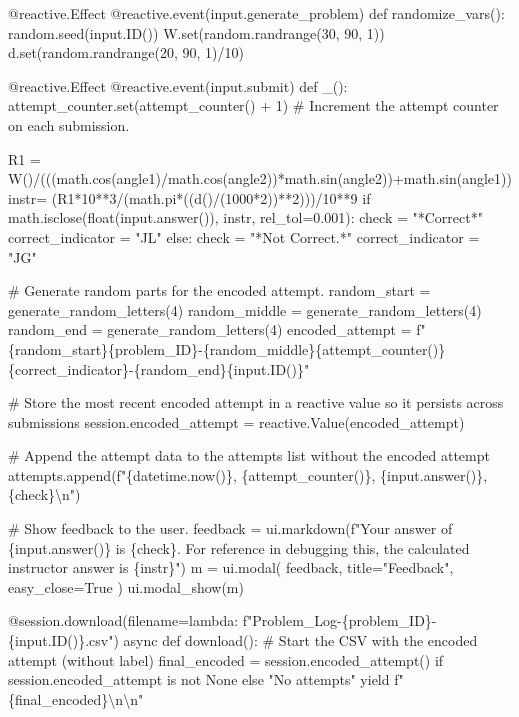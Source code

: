 \documentclass[
  letterpaper,
  DIV=11,
  numbers=noendperiod]{scrreprt}
\newenvironment{Shaded}{\begin{snugshade}}{\end{snugshade}}
\newcommand{\NormalTok}[1]{\textcolor[rgb]{0.00,0.23,0.31}{#1}}
\begin{document}
\begin{Shaded}
\begin{Highlighting}[]
\NormalTok{    @reactive.Effect}
\NormalTok{    @reactive.event(input.generate\_problem)}
\NormalTok{    def randomize\_vars():}
\NormalTok{        random.seed(input.ID())}
\NormalTok{        W.set(random.randrange(30, 90, 1))}
\NormalTok{        d.set(random.randrange(20, 90, 1)/10)}
        

\NormalTok{    @reactive.Effect}
\NormalTok{    @reactive.event(input.submit)}
\NormalTok{    def \_():}
\NormalTok{        attempt\_counter.set(attempt\_counter() + 1)  \# Increment the attempt counter on each submission.}
    
\NormalTok{        R1 = W()/(((math.cos(angle1)/math.cos(angle2))*math.sin(angle2))+math.sin(angle1))}
\NormalTok{        instr= (R1*10**3/(math.pi*((d()/(1000*2))**2)))/10**9}
\NormalTok{        if math.isclose(float(input.answer()), instr, rel\_tol=0.001):}
\NormalTok{            check = "*Correct*"}
\NormalTok{            correct\_indicator = "JL"}
\NormalTok{        else:}
\NormalTok{            check = "*Not Correct.*"}
\NormalTok{            correct\_indicator = "JG"}

\NormalTok{        \# Generate random parts for the encoded attempt.}
\NormalTok{        random\_start = generate\_random\_letters(4)}
\NormalTok{        random\_middle = generate\_random\_letters(4)}
\NormalTok{        random\_end = generate\_random\_letters(4)}
\NormalTok{        encoded\_attempt = f"\{random\_start\}\{problem\_ID\}{-}\{random\_middle\}\{attempt\_counter()\}\{correct\_indicator\}{-}\{random\_end\}\{input.ID()\}"}

\NormalTok{        \# Store the most recent encoded attempt in a reactive value so it persists across submissions}
\NormalTok{        session.encoded\_attempt = reactive.Value(encoded\_attempt)}

\NormalTok{        \# Append the attempt data to the attempts list without the encoded attempt}
\NormalTok{        attempts.append(f"\{datetime.now()\}, \{attempt\_counter()\}, \{input.answer()\}, \{check\}\textbackslash{}n")}

\NormalTok{        \# Show feedback to the user.}
\NormalTok{        feedback = ui.markdown(f"Your answer of \{input.answer()\} is \{check\}. For reference in debugging this, the calculated instructor answer is \{instr\}")}
\NormalTok{        m = ui.modal(}
\NormalTok{            feedback,}
\NormalTok{            title="Feedback",}
\NormalTok{            easy\_close=True}
\NormalTok{        )}
\NormalTok{        ui.modal\_show(m)}

\NormalTok{    @session.download(filename=lambda: f"Problem\_Log{-}\{problem\_ID\}{-}\{input.ID()\}.csv")}
\NormalTok{    async def download():}
\NormalTok{        \# Start the CSV with the encoded attempt (without label)}
\NormalTok{        final\_encoded = session.encoded\_attempt() if session.encoded\_attempt is not None else "No attempts"}
\NormalTok{        yield f"\{final\_encoded\}\textbackslash{}n\textbackslash{}n"}
        

\end{Highlighting}
\end{Shaded}
\end{document}
